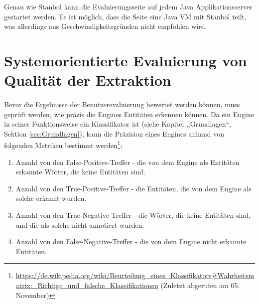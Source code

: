 
Genau wie Stanbol kann die Evaluierungsseite auf jedem Java Applikationsserver gestartet werden. Es ist möglich, dass die Seite eine Java VM mit Stanbol teilt, was allerdings aus Geschwindigkeitsgründen nicht empfohlen wird.

\section{Systemorientierte Evaluierung von Qualität der Extraktion} \label{sec:sysevalsec}
\paragraph{}
Bevor die Ergebnisse der Benutzerevaluierung bewertet werden können, muss geprüft werden, wie präzis die Engines Entitäten erkennen können. Da ein Engine in seiner Funktionsweise ein Klassifikator ist (siehe Kapitel ,,Grundlagen``, Sektion \ref{sec:Grundlagen}), kann die Präzision eines Engines anhand von folgenden Metriken bestimmt werden\footnote{\url{https://de.wikipedia.org/wiki/Beurteilung_eines_Klassifikators\#Wahrheitsmatrix:_Richtige_und_falsche_Klassifikationen} (Zuletzt abgerufen am 05. November)}:
\begin{enumerate}
\item Anzahl von den False-Positive-Treffer - die von dem Engine als Entitäten erkannte Wörter, die keine Entitäten sind.
\item Anzahl von den True-Positive-Treffer - die Entitäten, die von dem Engine als solche erkannt wurden.
\item Anzahl von den True-Negative-Treffer - die Wörter, die keine Entitäten sind, und die als solche nicht annotiert wurden.
\item Anzahl von den False-Negative-Treffer - die von dem Engine nicht erkannte Entitäten.
\end{enumerate}


